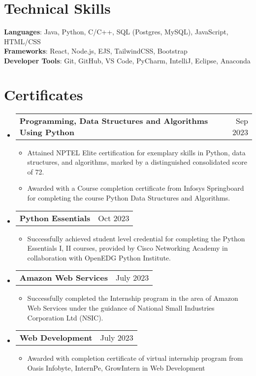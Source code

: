 \documentclass[letterpaper,11pt]{article}
\makeatletter
\newcommand{\resumeItem}[1]{
  \item\small{
    {#1 \vspace{-2pt}}
  }
}
\newcommand{\resumeProjectHeading}[2]{
    \item
    \begin{tabular*}{0.97\textwidth}{l@{\extracolsep{\fill}}r}
      \small#1 & #2 \\
    \end{tabular*}\vspace{-7pt}
}
\newcommand{\resumeSubHeadingListStart}{\begin{itemize}[leftmargin=0.15in, label={}]}
\newcommand{\resumeSubHeadingListEnd}{\end{itemize}}
\newcommand{\resumeItemListStart}{\begin{itemize}}
\newcommand{\resumeItemListEnd}{\end{itemize}\vspace{-5pt}}
\makeatother
\begin{document}
\section{Technical Skills}
 \begin{itemize}[leftmargin=0.15in, label={}]
    \small{\item{
     \textbf{Languages}{: Java, Python, C/C++, SQL (Postgres, MySQL), JavaScript, HTML/CSS} \\
     \textbf{Frameworks}{: React, Node.js, EJS, TailwindCSS, Bootstrap} \\
     \textbf{Developer Tools}{: Git, GitHub, VS Code, PyCharm, IntelliJ, Eclipse, Anaconda} \\
    }}
 \end{itemize}

\section{Certificates}
    \resumeSubHeadingListStart
    \resumeProjectHeading
          {\textbf{Programming, Data Structures and Algorithms Using Python}  \emph{}}{Sep 2023}
        \resumeItemListStart
        \resumeItem{Attained NPTEL Elite certification for exemplary skills in Python, data structures, and algorithms, marked by a distinguished consolidated score of 72.}
        \resumeItem{Awarded with a Course completion certificate from Infosys Springboard for completing the course Python Data Structures and Algorithms.}
    \resumeItemListEnd
    \resumeProjectHeading
          {\textbf{Python Essentials}  \emph{}}{Oct 2023}
        \resumeItemListStart
        \resumeItem{Successfully achieved student level credential for completing the Python Essentials I, II courses, provided by Cisco Networking Academy in collaboration with OpenEDG Python Institute.}
    \resumeItemListEnd
    \resumeProjectHeading
          {\textbf{Amazon Web Services}  \emph{}}{July 2023}
        \resumeItemListStart
        \resumeItem{Successfully completed the Internship program in the area of Amazon Web Services under the guidance of National Small Industries Corporation Ltd (NSIC).}
    \resumeItemListEnd
    \resumeProjectHeading
          {\textbf{Web Development}  \emph{}}{July 2023}
        \resumeItemListStart
        \resumeItem{Awarded with completion certificate of virtual internship program from Oasis Infobyte, InternPe, GrowIntern in Web Development}
    \resumeItemListEnd
    \resumeSubHeadingListEnd
\end{document}
